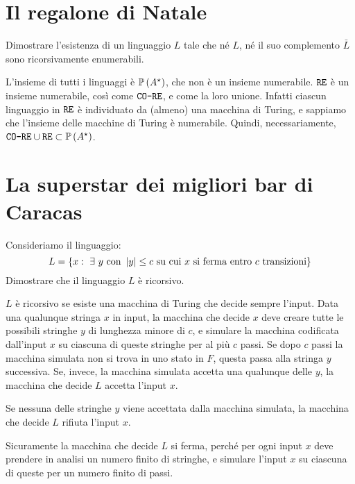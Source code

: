 \section{Il regalone di Natale}

\begin{esercizio}
Dimostrare l'esistenza di un linguaggio $L$ tale che n\'e $L$, n\'e il suo complemento $\bar{L}$ sono ricorsivamente enumerabili. 
\end{esercizio}

L'insieme di tutti i linguaggi \`e $\mathbb{P} \left( {A^{\star}} \right)$, che non \`e un insieme numerabile. $\texttt{RE}$ \`e un insieme numerabile, cos\`i come $\texttt{CO-RE}$, e come la loro unione. Infatti ciascun linguaggio in $\texttt{RE}$ \`e individuato da (almeno) una macchina di Turing, e sappiamo che l'insieme delle macchine di Turing \`e numerabile. Quindi, necessariamente, $\texttt{CO-RE} \cup \texttt{RE} \subset \mathbb{P} \left( {A^{\star}} \right)$.

\section{La superstar dei migliori bar di Caracas}

\begin{esercizio}
Consideriamo il linguaggio:
\[
L = \{ x : \exists y \text{ con } \abs{y} \le c \text{ su cui } x \text{ si ferma entro } c \text{ transizioni} \}
\]
Dimostrare che il linguaggio $L$ \`e ricorsivo.
\end{esercizio}

$L$ \`e ricorsivo se esiste una macchina di Turing che decide sempre l'input. Data una qualunque stringa $x$ in input, la macchina che decide $x$ deve creare tutte le possibili stringhe $y$ di lunghezza minore di $c$, e simulare la macchina codificata dall'input $x$ su ciascuna di queste stringhe per al pi\`u $c$ passi. Se dopo $c$ passi la macchina simulata non si trova in uno stato in $F$, questa passa alla stringa $y$ successiva. Se, invece, la macchina simulata accetta una qualunque delle $y$, la macchina che decide $L$ accetta l'input $x$.

Se nessuna delle stringhe $y$ viene accettata dalla macchina simulata, la macchina che decide $L$ rifiuta l'input $x$.

Sicuramente la macchina che decide $L$ si ferma, perch\'e per ogni input $x$ deve prendere in analisi un numero finito di stringhe, e simulare l'input $x$ su ciascuna di queste per un numero finito di passi.


















































